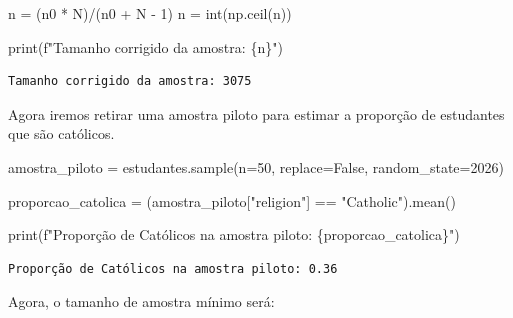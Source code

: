 \documentclass[
  letterpaper,
  DIV=11,
  numbers=noendperiod]{scrreprt}
\newenvironment{Shaded}{\begin{snugshade}}{\end{snugshade}}
\newcommand{\BuiltInTok}[1]{\textcolor[rgb]{0.00,0.23,0.31}{#1}}
\newcommand{\DecValTok}[1]{\textcolor[rgb]{0.68,0.00,0.00}{#1}}
\newcommand{\NormalTok}[1]{\textcolor[rgb]{0.00,0.23,0.31}{#1}}
\newcommand{\OperatorTok}[1]{\textcolor[rgb]{0.37,0.37,0.37}{#1}}
\newcommand{\SpecialCharTok}[1]{\textcolor[rgb]{0.37,0.37,0.37}{#1}}
\newcommand{\SpecialStringTok}[1]{\textcolor[rgb]{0.13,0.47,0.30}{#1}}
\newcommand{\StringTok}[1]{\textcolor[rgb]{0.13,0.47,0.30}{#1}}
\newcommand{\VariableTok}[1]{\textcolor[rgb]{0.07,0.07,0.07}{#1}}
\begin{document}
\begin{Shaded}
\begin{Highlighting}[]
\NormalTok{n }\OperatorTok{=}\NormalTok{ (n0 }\OperatorTok{*}\NormalTok{ N)}\OperatorTok{/}\NormalTok{(n0 }\OperatorTok{+}\NormalTok{ N }\OperatorTok{{-}} \DecValTok{1}\NormalTok{) }
\NormalTok{n }\OperatorTok{=} \BuiltInTok{int}\NormalTok{(np.ceil(n)) }

\BuiltInTok{print}\NormalTok{(}\SpecialStringTok{f"Tamanho corrigido da amostra: }\SpecialCharTok{\{}\NormalTok{n}\SpecialCharTok{\}}\SpecialStringTok{"}\NormalTok{)}
\end{Highlighting}
\end{Shaded}

\begin{verbatim}
Tamanho corrigido da amostra: 3075
\end{verbatim}

Agora iremos retirar uma amostra piloto para estimar a proporção de
estudantes que são católicos.

\begin{Shaded}
\begin{Highlighting}[]
\NormalTok{amostra\_piloto }\OperatorTok{=}\NormalTok{ estudantes.sample(n}\OperatorTok{=}\DecValTok{50}\NormalTok{, replace}\OperatorTok{=}\VariableTok{False}\NormalTok{, random\_state}\OperatorTok{=}\DecValTok{2026}\NormalTok{) }

\NormalTok{proporcao\_catolica }\OperatorTok{=}\NormalTok{ (amostra\_piloto[}\StringTok{"religion"}\NormalTok{] }\OperatorTok{==} \StringTok{"Catholic"}\NormalTok{).mean()}

\BuiltInTok{print}\NormalTok{(}\SpecialStringTok{f"Proporção de Católicos na amostra piloto: }\SpecialCharTok{\{}\NormalTok{proporcao\_catolica}\SpecialCharTok{\}}\SpecialStringTok{"}\NormalTok{)}
\end{Highlighting}
\end{Shaded}

\begin{verbatim}
Proporção de Católicos na amostra piloto: 0.36
\end{verbatim}

Agora, o tamanho de amostra mínimo será:
\end{document}
